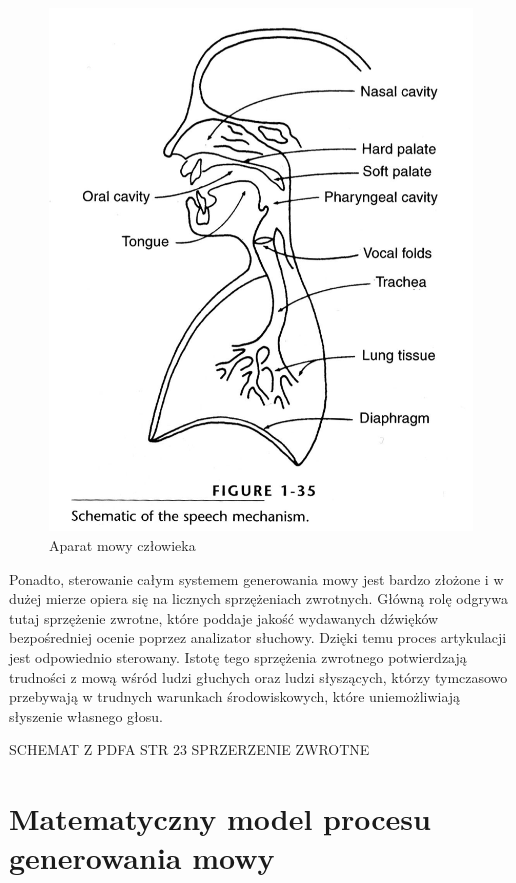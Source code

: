 \documentclass[eng,printmode]{mgr}
\begin{document}
\begin{figure}
	\includegraphics[scale=0.45]{speechmech.png}
	\caption{Aparat mowy człowieka}
\end{figure}

 Ponadto, sterowanie całym systemem generowania mowy jest bardzo złożone i w dużej mierze opiera się na licznych sprzężeniach zwrotnych. Główną rolę odgrywa tutaj sprzężenie zwrotne, które poddaje jakość wydawanych dźwięków bezpośredniej ocenie poprzez analizator słuchowy. Dzięki temu proces artykulacji jest odpowiednio sterowany. Istotę tego sprzężenia zwrotnego potwierdzają trudności z mową wśród ludzi głuchych oraz ludzi słyszących, którzy tymczasowo przebywają w trudnych warunkach środowiskowych, które uniemożliwiają słyszenie własnego głosu.
 
 SCHEMAT Z PDFA STR 23 SPRZERZENIE ZWROTNE  
 
 \section{Matematyczny model procesu generowania mowy}
\end{document}
